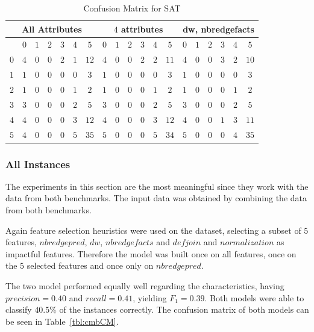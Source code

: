 \begin{table}
	\center
	\begin{tabular}{|c|cccccc|cccccc|cccccc|}
		\hline\multicolumn{7}{|c|}{All Attributes} &\multicolumn{6}{|c|}{$4$ attributes}&\multicolumn{6}{|c|}{dw, nbredgefacts}\\
		\hline &$0$&$1$&$2$&$3$&$4$&$5$&$0$&$1$&$2$&$3$&$4$&$5$&$0$&$1$&$2$&$3$&$4$&$5$\\
		\hline $0$ & $4$ & $0$ & $0$ & $2$ & $1$ & $12$& $4$ & $0$ & $0$ & $2$ & $2$ & $11$& $4$ & $0$ & $0$ & $3$ & $2$ & $10$\\
					 $1$ & $1$ & $0$ & $0$ & $0$ & $0$ & $3$ & $1$ & $0$ & $0$ & $0$ & $0$ & $3$ & $1$ & $0$ & $0$ & $0$ & $0$ & $3$\\
					 $2$ & $1$ & $0$ & $0$ & $0$ & $1$ & $2$ & $1$ & $0$ & $0$ & $0$ & $1$ & $2$ & $1$ & $0$ & $0$ & $0$ & $1$ & $2$\\
					 $3$ & $3$ & $0$ & $0$ & $0$ & $2$ & $5$ & $3$ & $0$ & $0$ & $0$ & $2$ & $5$ & $3$ & $0$ & $0$ & $0$ & $2$ & $5$\\
					 $4$ & $4$ & $0$ & $0$ & $0$ & $3$ & $12$& $4$ & $0$ & $0$ & $0$ & $3$ & $12$& $4$ & $0$ & $0$ & $1$ & $3$ & $11$\\
					 $5$ & $4$ & $0$ & $0$ & $0$ & $5$ & $35$& $5$ & $0$ & $0$ & $0$ & $5$ & $34$& $5$ & $0$ & $0$ & $0$ & $4$ & $35$\\
		\hline
	\end{tabular}
	\caption{Confusion Matrix for SAT}
	\label{tbl:satCME1}
\end{table}

\subsubsection{All Instances}
The experiments in this section are the most meaningful since they work with the data from both benchmarks. The input data was obtained by combining the data from both benchmarks.

Again feature selection heuristics were used on the dataset, selecting a subset of $5$ features, \inline$nbredgepred$, \inline$dw$, \inline$nbredgefacts$ and \inline$defjoin$ and \inline$normalization$ as impactful features. Therefore the model was built once on all features, once on the $5$ selected features and once only on \inline$nbredgepred$.

The two model performed equally well regarding the characteristics, having $precision=0.40$ and $recall=0.41$, yielding $F_1=0.39$. Both models were able to classify $40.5\%$ of the instances correctly. The confusion matrix of both models can be seen in Table~\ref{tbl:cmbCM}.

